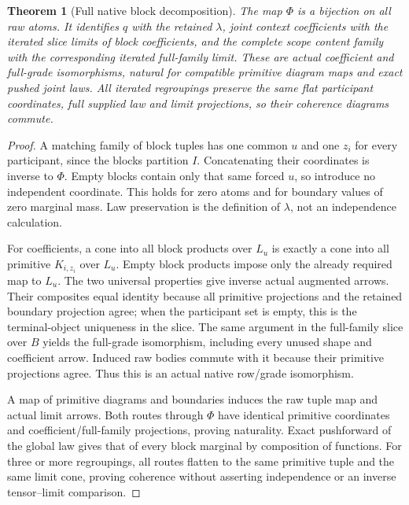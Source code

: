 \documentclass[11pt]{article}
\newtheorem{theorem}{Theorem}\newtheorem{proposition}[theorem]{Proposition}
\begin{document}
\begin{theorem}[Full native block decomposition]
The map $\Phi$ is a bijection on all raw atoms. It identifies $q$ with the retained $\lambda$, joint context coefficients with the iterated slice limits of block coefficients, and the complete scope content family with the corresponding iterated full-family limit. These are actual coefficient and full-grade isomorphisms, natural for compatible primitive diagram maps and exact pushed joint laws. All iterated regroupings preserve the same flat participant coordinates, full supplied law and limit projections, so their coherence diagrams commute.
\end{theorem}
\begin{proof}
A matching family of block tuples has one common $u$ and one $z_i$ for every participant, since the blocks partition $I$. Concatenating their coordinates is inverse to $\Phi$. Empty blocks contain only that same forced $u$, so introduce no independent coordinate. This holds for zero atoms and for boundary values of zero marginal mass. Law preservation is the definition of $\lambda$, not an independence calculation.

For coefficients, a cone into all block products over $L_u$ is exactly a cone into all primitive $K_{i,z_i}$ over $L_u$. Empty block products impose only the already required map to $L_u$. The two universal properties give inverse actual augmented arrows. Their composites equal identity because all primitive projections and the retained boundary projection agree; when the participant set is empty, this is the terminal-object uniqueness in the slice. The same argument in the full-family slice over $B$ yields the full-grade isomorphism, including every unused shape and coefficient arrow. Induced raw bodies commute with it because their primitive projections agree. Thus this is an actual native row/grade isomorphism.

A map of primitive diagrams and boundaries induces the raw tuple map and actual limit arrows. Both routes through $\Phi$ have identical primitive coordinates and coefficient/full-family projections, proving naturality. Exact pushforward of the global law gives that of every block marginal by composition of functions. For three or more regroupings, all routes flatten to the same primitive tuple and the same limit cone, proving coherence without asserting independence or an inverse tensor--limit comparison.
\end{proof}
\end{document}
